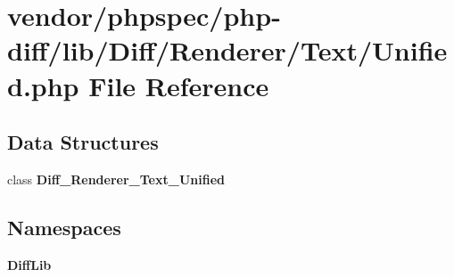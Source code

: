 \section{vendor/phpspec/php-\/diff/lib/\+Diff/\+Renderer/\+Text/\+Unified.php File Reference}
\label{_unified_8php}
\subsection*{Data Structures}
\begin{DoxyCompactItemize}
\item 
class {\bf Diff\+\_\+\+Renderer\+\_\+\+Text\+\_\+\+Unified}
\end{DoxyCompactItemize}
\subsection*{Namespaces}
\begin{DoxyCompactItemize}
\item 
 {\bf Diff\+Lib}
\end{DoxyCompactItemize}
